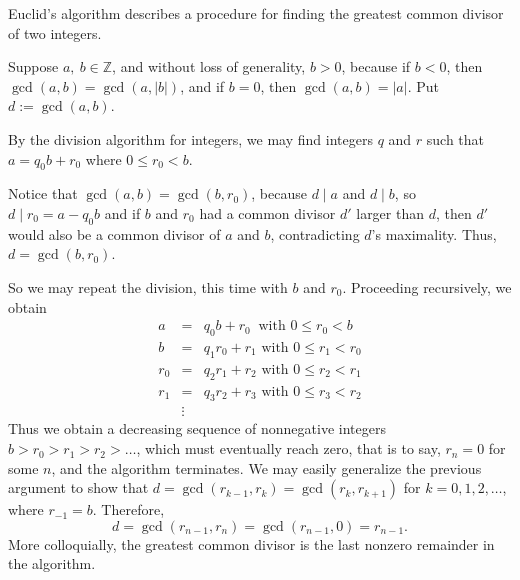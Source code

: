 \documentclass{article}
\theoremstyle{definition}
\theoremstyle{definition}
\theoremstyle{definition}
\newcommand{\ZZ}{\mathbb{Z}}
\begin{document}
Euclid's algorithm describes a procedure for finding the greatest common divisor of two integers.

Suppose $a,~b \in \ZZ$, and without loss of generality, $b > 0$, because if $b < 0$, 
then $\gcd(a,b) = \gcd (a, |b| )$, and if $b = 0$, then $\gcd (a,b) = |a| $.  
Put $d := \gcd (a,b)$.

By the division algorithm for integers, we may find integers $q$ and $r$ such that
$a = q_0 b + r_0  $  where $ 0 \leq r_0 < b$.
  
Notice that $\gcd(a,b) = \gcd(b, r_0)$, because $d \mid a$ and $d \mid b$, so $d \mid r_0 = a - q_0b$ and 
if $b$ and $r_0$ had a common divisor $d'$ larger  than $d$, then $d'$ would also be a common divisor of 
$a$ and $b$, contradicting $d$'s maximality.  Thus, $d = \gcd(b, r_0)$.

So we may repeat the division, this time with $b$ and $r_0$.  Proceeding recursively, we obtain
\begin{eqnarray*}
  a   &=& q_0b   + r_0 ~\mbox{  with } 0 \leq r_0 < b    \\
  b   &=& q_1r_0 + r_1 \mbox{ with } 0 \leq r_1 < r_0  \\
  r_0 &=& q_2r_1 + r_2 \mbox{ with } 0 \leq r_2 < r_1  \\
  r_1 &=& q_3r_2 + r_3 \mbox{ with } 0 \leq r_3 < r_2  \\
      &\vdots&
\end{eqnarray*}
Thus we obtain a decreasing sequence of nonnegative integers $b > r_0 > r_1 > r_2 > \dots$, which
must eventually reach zero, that is to say,
$r_n = 0$ for some $n$, and the algorithm terminates.  We may easily generalize the previous 
argument to show that $d = \gcd(r_{k-1}, r_k) = \gcd(r_k, r_{k+1})$ for $k = 0, 1, 2, \dots$, 
where $r_{-1} = b$.  Therefore, \[d = \gcd(r_{n-1}, r_n) = \gcd(r_{n-1}, 0) = r_{n-1}.\]  More 
colloquially, the greatest common divisor is the last nonzero remainder in the algorithm.
\end{document}
